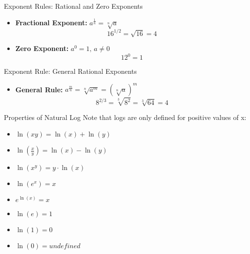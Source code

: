\documentclass[aspectratio=169]{beamer}
\begin{document}
\begin{frame}{Exponent Rules: Rational and Zero Exponents}\label{example4}
\vspace{-1cm}
\begin{itemize}
    \item \textbf{Fractional Exponent:} $a^{\frac{1}{n}} = \sqrt[n]{a}$
    \[
    16^{1/2} = \sqrt{16} = 4
    \]

    \item \textbf{Zero Exponent:} $a^0 = 1, \, a \ne 0$
    \[
    12^0 = 1
    \]
\end{itemize}
\end{frame}

\begin{frame}{Exponent Rule: General Rational Exponents}\label{example5}
\vspace{-1cm}
\begin{itemize}
    \item \textbf{General Rule:} $a^{\frac{m}{n}} = \sqrt[n]{a^m} = \left(\sqrt[n]{a}\right)^m$
    \[
    8^{2/3} = \sqrt[3]{8^2} = \sqrt[3]{64} = 4
    \]
\end{itemize}
\end{frame}

\begin{frame}{Properties of Natural Log}\label{main1}
Note that logs are only defined for positive values of x:
\begin{itemize}
\begin{itemize}
    \item $\ln(xy) = \ln(x) + \ln(y)$
    \item $\ln\left(\frac{x}{y}\right) = \ln(x) - \ln(y)$
    \item $\ln(x^y) = y \cdot \ln(x)$
    \item $\ln(e^x) = x$
    \item $e^{\ln(x)} = x$
    \item $\ln(e) = 1$
    \item $\ln(1) = 0$
    \item $\ln(0) = undefined$
\end{itemize}
\end{itemize}
\end{frame}
\end{document}
